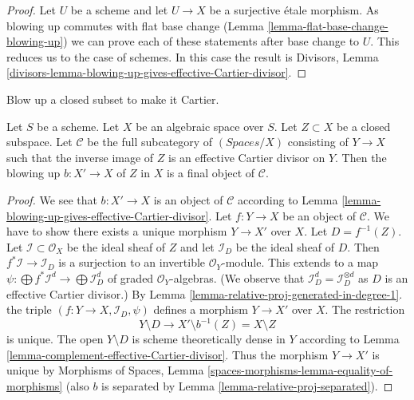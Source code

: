 \begin{proof}
Let $U$ be a scheme and let $U \to X$ be a surjective \'etale morphism.
As blowing up commutes with flat base change
(Lemma \ref{lemma-flat-base-change-blowing-up})
we can prove each of these statements after base change to $U$.
This reduces us to the case of schemes.
In this case the result is
Divisors, Lemma
\ref{divisors-lemma-blowing-up-gives-effective-Cartier-divisor}.
\end{proof}

\begin{lemma}
\label{lemma-universal-property-blowing-up}
\begin{slogan}
Blow up a closed subset to make it Cartier.
\end{slogan}
Let $S$ be a scheme.
Let $X$ be an algebraic space over $S$.
Let $Z \subset X$ be a closed subspace.
Let $\mathcal{C}$ be the full subcategory of $(\textit{Spaces}/X)$ consisting
of $Y \to X$ such that the inverse image of $Z$ is an effective
Cartier divisor on $Y$. Then the blowing up $b : X' \to X$ of $Z$ in $X$
is a final object of $\mathcal{C}$.
\end{lemma}

\begin{proof}
We see that $b : X' \to X$ is an object of $\mathcal{C}$ according to
Lemma \ref{lemma-blowing-up-gives-effective-Cartier-divisor}.
Let $f : Y \to X$ be an object of $\mathcal{C}$. We have to show there exists
a unique morphism $Y \to X'$ over $X$. Let $D = f^{-1}(Z)$.
Let $\mathcal{I} \subset \mathcal{O}_X$ be the ideal sheaf of $Z$
and let $\mathcal{I}_D$ be the ideal sheaf of $D$. Then
$f^*\mathcal{I} \to \mathcal{I}_D$ is a surjection
to an invertible $\mathcal{O}_Y$-module. This extends to a map
$\psi : \bigoplus f^*\mathcal{I}^d \to \bigoplus \mathcal{I}_D^d$
of graded $\mathcal{O}_Y$-algebras. (We observe that
$\mathcal{I}_D^d = \mathcal{I}_D^{\otimes d}$ as $D$ is an
effective Cartier divisor.) By
Lemma \ref{lemma-relative-proj-generated-in-degree-1}.
the triple $(f : Y \to X, \mathcal{I}_D, \psi)$ defines a
morphism $Y \to X'$ over $X$. The restriction
$$
Y \setminus D \longrightarrow X' \setminus b^{-1}(Z) = X \setminus Z
$$
is unique. The open $Y \setminus D$ is scheme theoretically dense in $Y$
according to Lemma \ref{lemma-complement-effective-Cartier-divisor}. 
Thus the morphism $Y \to X'$ is unique by
Morphisms of Spaces, Lemma \ref{spaces-morphisms-lemma-equality-of-morphisms}
(also $b$ is separated by Lemma
\ref{lemma-relative-proj-separated}).
\end{proof}

